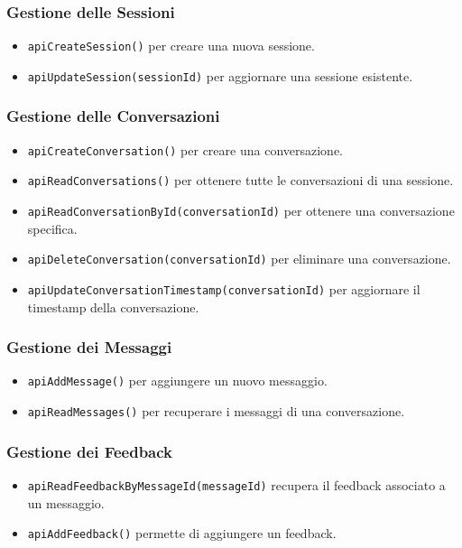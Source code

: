 \subsubsection*{Gestione delle Sessioni}
\begin{itemize}
    \item \texttt{apiCreateSession()} per creare una nuova sessione.
    \item \texttt{apiUpdateSession(sessionId)} per aggiornare una sessione esistente.
\end{itemize}

\subsubsection*{Gestione delle Conversazioni}
\begin{itemize}
    \item \texttt{apiCreateConversation()} per creare una conversazione.
    \item \texttt{apiReadConversations()} per ottenere tutte le conversazioni di una sessione.
    \item \texttt{apiReadConversationById(conversationId)} per ottenere una conversazione specifica.
    \item \texttt{apiDeleteConversation(conversationId)} per eliminare una conversazione.
    \item \texttt{apiUpdateConversationTimestamp(conversationId)} per aggiornare il timestamp della conversazione.
\end{itemize}

\subsubsection*{Gestione dei Messaggi}
\begin{itemize}
    \item \texttt{apiAddMessage()} per aggiungere un nuovo messaggio.
    \item \texttt{apiReadMessages()} per recuperare i messaggi di una conversazione.
\end{itemize}

\subsubsection*{Gestione dei Feedback}
\begin{itemize}
    \item \texttt{apiReadFeedbackByMessageId(messageId)} recupera il feedback associato a un messaggio.
    \item \texttt{apiAddFeedback()} permette di aggiungere un feedback.
\end{itemize}

